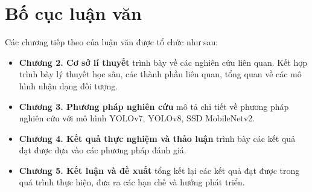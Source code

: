 \documentclass[../the.tex]{subfiles}
\begin{document}
\section{Bố cục luận văn}
\label{bo_cuc}

{\fontsize{13}{12} \selectfont

Các chương tiếp theo của luận văn được tổ chức như sau:

\begin{itemize}
  \item \textbf{Chương 2. Cơ sở lí thuyết} trình bày về các nghiên cứu liên quan. Kết hợp trình bày lý thuyết học sâu, các thành phần liên quan, tổng quan về các mô hình nhận dạng đối tượng.
  \item \textbf{Chương 3. Phương pháp nghiên cứu} mô tả chi tiết về phương pháp nghiên cứu với mô hình YOLOv7, YOLOv8, SSD MobileNetv2.
  \item \textbf{Chương 4. Kết quả thực nghiệm và thảo luận} trình bày các kết quả đạt được dựa vào các phương pháp đánh giá.
  \item \textbf{Chương 5. Kết luận và đề xuất} tổng kết lại các kết quả đạt được trong quá trình thực hiện, đưa ra các hạn chế và hướng phát triển.
\end{itemize}

}





\end{document}
